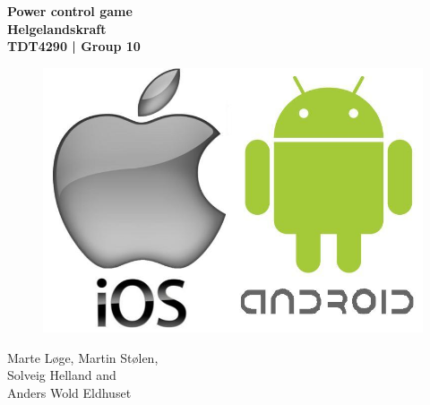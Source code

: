 \begin{titlepage}
\begin{center}

{\Huge \bf Power control game} \\[1.0cm]
{\Huge \bf Helgelandskraft} \\[1.0cm]
{\Large \bf TDT4290 | Group 10} \\[4.0cm]

\begin{figure}[!ht]
	\centering
	\includegraphics[scale=0.5]{pictures/android-ios.jpeg}
\end{figure}
\vspace{3.5cm}

{Marte Løge, Martin Stølen, \\
Solveig Helland and \\
Anders Wold Eldhuset}


\end{center}
\end{titlepage}